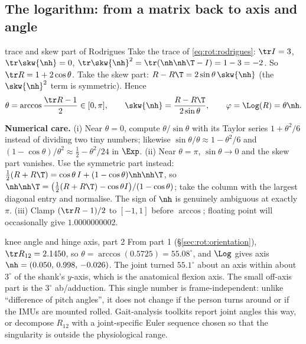 \subsection{The logarithm: from a matrix back to axis and angle}\label{sec:rot:log}\label{sec:rot:logarithm-matrix-back}
\begin{deriv}{trace and skew part of Rodrigues}
Take the trace of \eqref{eq:rot:rodrigues}: $\tr I=3$, $\tr\skw{\nh}=0$, $\tr\skw{\nh}^2=\tr(\nh\nh\T-I)=1-3=-2$. So $\tr R=1+2\cos\theta$. Take the skew part: $R-R\T=2\sin\theta\,\skw{\nh}$ (the $\skw{\nh}^2$ term is symmetric). Hence
\[
\theta=\arccos\frac{\tr R-1}{2}\in[0,\pi],\qquad \skw{\nh}=\frac{R-R\T}{2\sin\theta},\qquad \varphi=\Log(R)=\theta\nh .
\]
\end{deriv}
\textbf{Numerical care.} (i) Near $\theta=0$, compute $\theta/\sin\theta$ with its Taylor series $1+\theta^2/6$ instead of dividing two tiny numbers; likewise $\sin\theta/\theta\approx1-\theta^2/6$ and $(1-\cos\theta)/\theta^2\approx\frac12-\theta^2/24$ in $\Exp$. (ii) Near $\theta=\pi$, $\sin\theta\to0$ and the skew part vanishes. Use the symmetric part instead: $\frac12(R+R\T)=\cos\theta\,I+(1-\cos\theta)\nh\nh\T$, so $\nh\nh\T=\big(\tfrac12(R+R\T)-\cos\theta I\big)/(1-\cos\theta)$; take the column with the largest diagonal entry and normalise. The sign of $\nh$ is genuinely ambiguous at exactly $\pi$. (iii) Clamp $(\tr R-1)/2$ to $[-1,1]$ before $\arccos$; floating point will occasionally give $1.0000000002$.

\begin{example}{knee angle and hinge axis, part 2}
From part 1 (\S\ref{sec:rot:orientation}), $\tr R_{12}=2.1450$, so $\theta=\arccos(0.5725)=55.08^\circ$, and $\Log$ gives axis $\nh=(0.050,\,0.998,\,-0.026)$. The joint turned $55.1^\circ$ about an axis within about $3^\circ$ of the shank's $y$-axis, which is the anatomical flexion axis. The small off-axis part is the $3^\circ$ ab/adduction. This single number is frame-independent: unlike ``difference of pitch angles'', it does not change if the person turns around or if the IMUs are mounted rolled. Gait-analysis toolkits report joint angles this way, or decompose $R_{12}$ with a joint-specific Euler sequence chosen so that the singularity is outside the physiological range.
\end{example}
